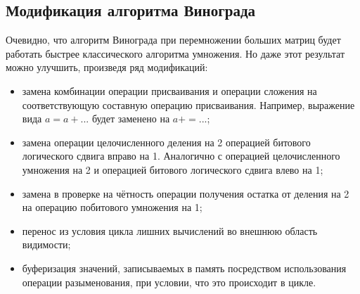 \subsection{Модификация алгоритма Винограда}
Очевидно, что алгоритм Винограда при перемножении больших матриц будет работать быстрее классического алгоритма умножения. Но даже этот результат можно улучшить, произведя ряд модификаций:
\begin{itemize}
    \item замена комбинации операции присваивания и операции сложения на соответствующую составную операцию присваивания. Например, выражение вида $a = a + ...$ будет заменено на $a += ...$;
    \item замена операции целочисленного деления на 2 операцией битового логического сдвига вправо на 1. Аналогично с операцией целочисленного умножения на 2 и операцией битового логического сдвига влево на 1;
    \item замена в проверке на чётность операции получения остатка от деления на 2 на операцию побитового умножения на 1;
    \item перенос из условия цикла лишних вычислений во внешнюю область видимости;
    \item буферизация значений, записываемых в память посредством использования операции разыменования, при условии, что это происходит в цикле.
\end{itemize}

